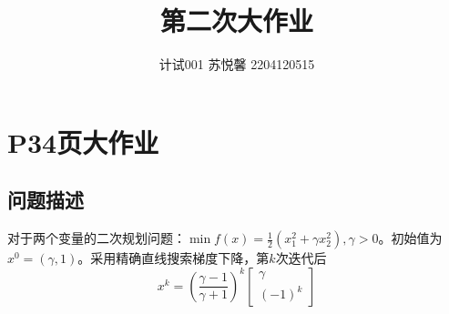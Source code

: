 \documentclass{article}
\title{第二次大作业}
\author{计试001 苏悦馨 2204120515}
\begin{document}
\maketitle

\section{P34页大作业}

\subsection{问题描述}
对于两个变量的二次规划问题：$\min f(x) = \frac{1}{2} (x_1^2+\gamma x_2^2), \gamma > 0$。初始值为$x^0=(\gamma,1)$。采用精确直线搜索梯度下降，第$k$次迭代后
\begin{equation*}
    x^k=(\frac{\gamma-1}{\gamma+1})^k
    \left[ \begin{array}{c}
            \gamma \\
            (-1)^k
        \end{array}\right]
\end{equation*}



\end{document}
